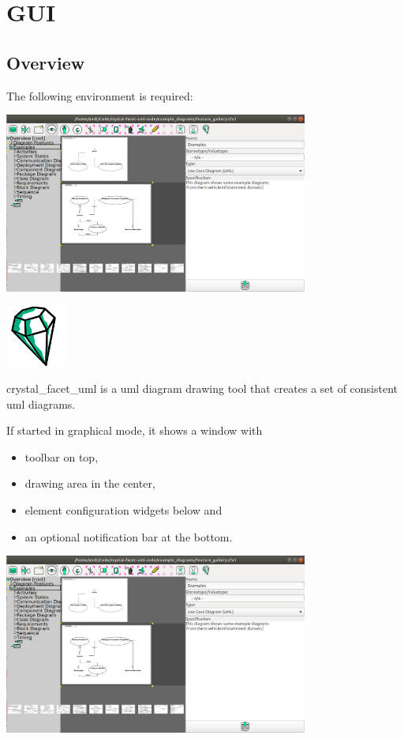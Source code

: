 \chapter{GUI}
\label{gui}

\section{Overview}

The following environment is required:

\includegraphics[width=10cm]{screenshot_1.png}

\includegraphics[width=2cm]{../../gui/source/resources/crystal_facet_uml.pdf}


crystal\_facet\_uml is a uml diagram drawing tool
that creates a set of consistent uml diagrams.

If started in graphical mode, it shows a window with
\begin{itemize}
\item toolbar on top,
\item drawing area in the center,
\item element configuration widgets below and
\item an optional notification bar at the bottom.
\end{itemize}

\includegraphics[width=10cm]{screenshot_1.png}

